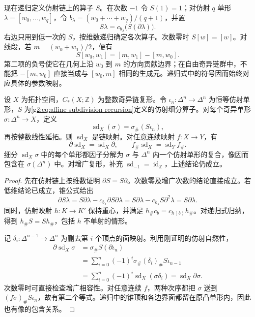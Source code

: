 现在递归定义仿射链上的算子 \(S\)。在次数 \(-1\) 令 \(S(1)=1\)；对仿射 \(q\) 单形 \(\lambda=[w_0,\ldots,w_q]\)，令 \(b_\lambda=(w_0+\cdots+w_q)/(q+1)\)，并置
\begin{equation}\label{g2:eq:affine-subdivision-recursion}
	S\lambda=c_{b_\lambda}\bigl(S(\partial\lambda)\bigr).
\end{equation}
右边只用到低一次的 \(S\)，按维数递归确定各次算子。次数零时 \(S[w]=[w]\)。对线段，若 \(m=(w_0+w_1)/2\)，便有
\[
	S[w_0,w_1]=[m,w_1]-[m,w_0].
\]
第二项的负号使它在几何上沿 \(w_0\) 到 \(m\) 的方向贡献边界；在自由奇异链群中，不能把 \(-[m,w_0]\) 直接当成与 \([w_0,m]\) 相同的生成元。递归式中的符号因而始终对应具体的参数映射。

\begin{proposition}\label{g2:prop:subdivision-chain-map}
	设 \(X\) 为拓扑空间，\(C_*(X;\mathbb Z)\) 为整数奇异链复形。令 \(\iota_n:\Delta^n\to\Delta^n\) 为恒等仿射单形，\(S\) 为\eqref{g2:eq:affine-subdivision-recursion}定义的仿射细分算子。对每个奇异单形 \(\sigma:\Delta^n\to X\)，定义
	\[
		\operatorname{sd}_X(\sigma)=\sigma_\#(S\iota_n),
	\]
	再按整数线性延拓。则 \(\operatorname{sd}_X\) 是链映射。对任意连续映射 \(f:X\to Y\)，有
	\[
		\partial\operatorname{sd}_X=\operatorname{sd}_X\partial,
		\qquad
		f_\#\operatorname{sd}_X=\operatorname{sd}_Yf_\#.
	\]
	细分 \(\operatorname{sd}_X\sigma\) 中的每个单形都因子分解为 \(\sigma\) 与 \(\Delta^n\) 内一个仿射单形的复合，像因而包含在 \(\sigma(\Delta^n)\) 中。对增广复形，补充 \(\operatorname{sd}_{-1}=\operatorname{id}_{\mathbb Z}\)，上述结论仍成立。
\end{proposition}
\begin{proof}
	先在仿射链上按维数证明 \(\partial S=S\partial\)。次数零及增广次数的结论直接成立。若低维结论已成立，锥公式给出
	\[
		\partial S\lambda
		=S\partial\lambda-c_{b_\lambda}\partial S\partial\lambda
		=S\partial\lambda-c_{b_\lambda}S\partial^2\lambda
		=S\partial\lambda.
	\]
	同时，仿射映射 \(h:K\to K'\) 保持重心，并满足 \(h_\#c_b=c_{h(b)}h_\#\)。对递归式归纳，得到 \(h_\#S=Sh_\#\)，包括 \(h\) 不单射的情形。

	记 \(\delta_i:\Delta^{n-1}\to\Delta^n\) 为删去第 \(i\) 个顶点的面映射。利用刚证明的仿射自然性，
	\[
		\begin{aligned}
			\partial\operatorname{sd}_X\sigma
			&=\sigma_\#S(\partial\iota_n)\\
			&=\sum_{i=0}^n(-1)^i
				\sigma_\#(\delta_i)_\#S\iota_{n-1}\\
			&=\sum_{i=0}^n(-1)^i
				\operatorname{sd}_X(\sigma\delta_i)
			=\operatorname{sd}_X\partial\sigma.
		\end{aligned}
	\]
	次数零时可直接检查增广相容性。对任意连续 \(f\)，两种次序都把 \(\sigma\) 送到 \((f\sigma)_\#S\iota_n\)，故有第二个等式。递归中的锥顶和各边界面都留在原凸单形内，因此也有像的包含关系。
\end{proof}

